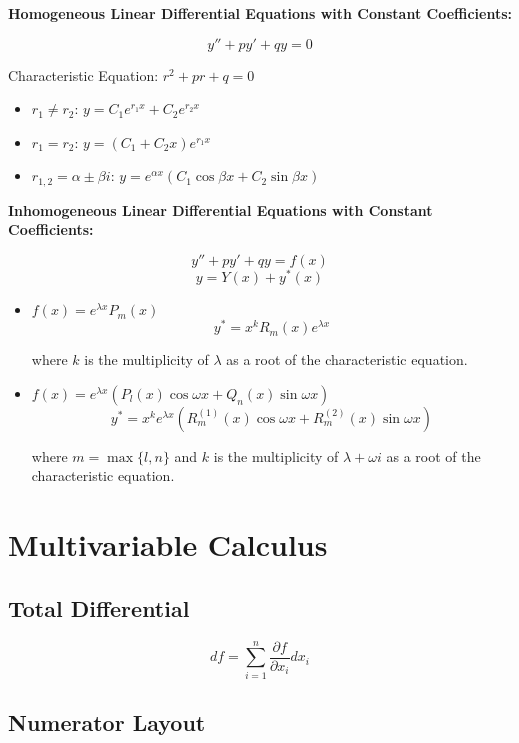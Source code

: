 \documentclass{article}
\begin{document}
\textbf{Homogeneous Linear Differential Equations with Constant Coefficients:}

\[
    y'' + py' + qy = 0
\]

Characteristic Equation: $r^2 + pr + q = 0$

\begin{itemize}
    \item $r_1 \neq r_2$: $y = C_1 e^{r_1 x} + C_2 e^{r_2 x}$
    \item $r_1 = r_2$: $y = (C_1 + C_2 x) e^{r_1 x}$
    \item $r_{1,2} = \alpha \pm \beta i$: $y = e^{\alpha x}(C_1 \cos \beta x + C_2 \sin \beta x)$
\end{itemize}

\textbf{Inhomogeneous Linear Differential Equations with Constant Coefficients:}

\[
    y'' + py' + qy = f(x)
\]
\[
    y = Y(x) + y^*(x)
\]

\begin{itemize}
    \item $f(x) = e^{\lambda x} P_m(x)$
    \[
        y^* = x^k R_m(x) e^{\lambda x}
    \]

    where $k$ is the multiplicity of $\lambda$ as a root of the characteristic equation.

    \item $f(x) = e^{\lambda x}(P_l(x) \cos \omega x + Q_n(x) \sin \omega x)$
    \[
        y^* = x^k e^{\lambda x}(R_m^{(1)}(x) \cos \omega x + R_m^{(2)}(x) \sin \omega x)
    \]

    where $m = \max\{l, n\}$ and $k$ is the multiplicity of $\lambda + \omega i$ as a root of the characteristic equation.
\end{itemize}

\newpage
\section{Multivariable Calculus}

\subsection{Total Differential}

\[
    df = \sum_{i=1}^n \frac{\partial f}{\partial x_i} dx_i
\]

\subsection{Numerator Layout}
\end{document}
